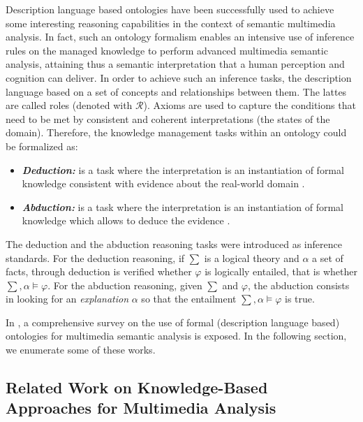 		Description language based ontologies have been successfully used to achieve some interesting
		reasoning capabilities in the context of semantic multimedia analysis. In fact, such an ontology 
		formalism enables an intensive use of inference rules on the managed knowledge to perform advanced 
		multimedia semantic analysis, attaining thus a semantic interpretation that a human perception and 
		cognition can deliver. In order to achieve such an inference tasks, the description language  
		based on a set of concepts and relationships between them. The lattes are called roles 
		(denoted with $\mathcal{R}$). Axioms are used to capture the conditions that need to be met 
		by consistent and coherent interpretations (the states of the domain). Therefore, the knowledge 
		management tasks within an ontology could be formalized as:

		\begin{itemize}
			\item \textbf{\textit{Deduction:}} is a task where the interpretation is an instantiation of 
			formal knowledge consistent with evidence about the real-world domain 
			\citep{Hartz2007,Hudelot2008,Dasiopoulou2009a}.
			
			\item \textbf{\textit{Abduction:}} is a task where the interpretation is an instantiation of 
			formal knowledge which allows to deduce the evidence \citep{Shanahan2005,Peraldi2007,Atif2014}.
		\end{itemize}
		The deduction and the abduction reasoning tasks were introduced as inference standards. 
		For the deduction reasoning, if $\sum$ is a logical theory and $\alpha$ a set of facts, 
		through deduction is verified whether $\varphi$ is logically entailed, that is whether $\sum, 
		\alpha \models \varphi$. For the abduction reasoning, given $\sum$ and $\varphi$, the abduction 
		consists in looking for an \emph{explanation} $\alpha$ so that the entailment $\sum, \alpha \models 
		\varphi$ is true.

		In \citep{Neumann2008,Moeller2008,Dasiopoulou2010,Bannour2014}, a comprehensive survey on 
		the use of formal (description language based) ontologies for multimedia semantic analysis
		is exposed. In the following section, we enumerate some of these works.

		



		\subsection{Related Work on Knowledge-Based Approaches for Multimedia Analysis}

